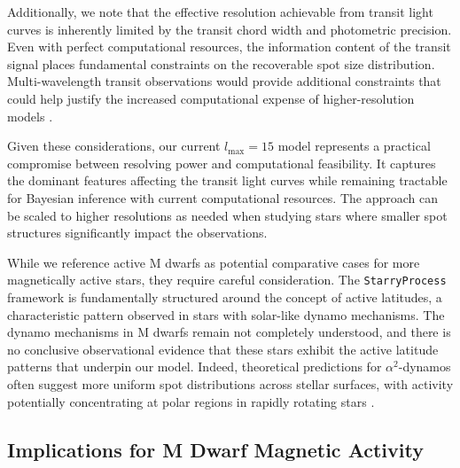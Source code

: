 \documentclass[twocolumn]{aastex631}
\begin{document}
Additionally, we note that the effective resolution achievable from transit light curves is inherently limited by the transit 
chord width and photometric precision. Even with perfect computational resources, the information content of the transit 
signal places fundamental constraints on the recoverable spot size distribution. Multi-wavelength transit observations 
would provide additional constraints that could help justify the increased computational expense of higher-resolution 
models \citep{Gastine2013,Strassmeier2009}.

Given these considerations, our current $l_{\text{max}}=15$ model represents a practical compromise between resolving 
power and computational feasibility. It captures the dominant features affecting the transit light curves while remaining 
tractable for Bayesian inference with current computational resources. The approach can be scaled to higher resolutions as 
needed when studying stars where smaller spot structures significantly impact the observations.

While we reference active M dwarfs as 
potential comparative cases for more magnetically active stars, they require careful consideration.
The \texttt{StarryProcess} framework is fundamentally structured around the concept of active latitudes, 
a characteristic pattern observed in stars with solar-like dynamo mechanisms. The dynamo mechanisms in M dwarfs 
remain not completely understood, and there is no conclusive observational evidence that these stars exhibit the 
active latitude patterns that underpin our model. Indeed, theoretical predictions for $\alpha^2$-dynamos often suggest more 
uniform spot distributions across stellar surfaces, with activity potentially concentrating at polar regions in rapidly 
rotating stars \citep{Yadav2015,Gastine2013,Chabrier2006}. 

\subsection{Implications for M Dwarf Magnetic Activity}
\end{document}
